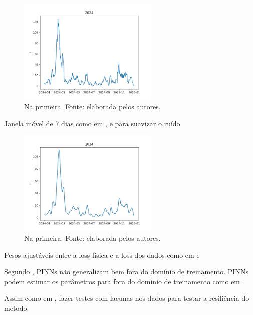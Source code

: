 \begin{figure}[htpb]
\centering
\includegraphics[width=0.6\textwidth]{figuras/data-2024-ES.png}
\caption{Na primeira. Fonte: elaborada pelos autores.}
\label{fig:dados-reais-sus-crus}
\end{figure}

Janela móvel de 7 dias como em \cite{han-etal:24-prim-artigo-alemanha},
\cite{long-etal:21-L2} e \cite{shamsara-etal:25-omicron} para suavizar o ruído


\begin{figure}[htpb]
\centering
\includegraphics[width=0.6\textwidth]{figuras/smoothed-data-2024-ES.png}
\caption{Na primeira. Fonte: elaborada pelos autores.}
\label{fig:dados-reais-sus-media-movel}
\end{figure}

Pesos ajustáveis entre a loss física e a loss dos dados como em 
\cite{long-etal:21-L2} e 
\cite{shamsara-etal:25-omicron}

Segundo \cite{bonfanti-etal:24-generalizacao-pinns}, PINNs não generalizam bem
fora do domínio de treinamento. PINNs podem estimar os parâmetros para fora
do domínio de treinamento como em \cite{millevoi-etal:24-split-join-pinns}.

Assim como em \cite{ghosh-etal:23-subnotificacao}, fazer testes com lacunas
nos dados para testar a resiliência do método.

